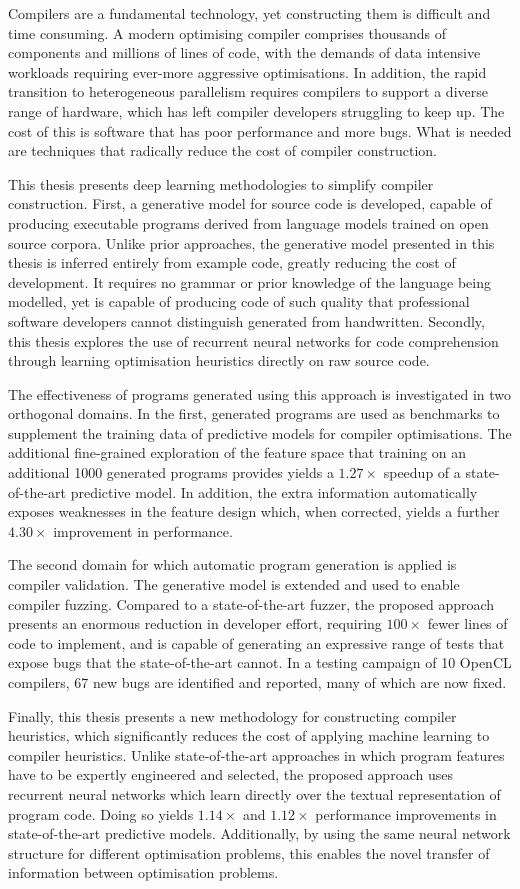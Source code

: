 Compilers are a fundamental technology, yet constructing them is difficult and time consuming. A modern optimising compiler comprises thousands of components and millions of lines of code, with the demands of data intensive workloads requiring ever-more aggressive optimisations. In addition, the rapid transition to heterogeneous parallelism requires compilers to support a diverse range of hardware, which has left compiler developers struggling to keep up. The cost of this is software that has poor performance and more bugs. What is needed are techniques that radically reduce the cost of compiler construction.

This thesis presents deep learning methodologies to simplify compiler construction. First, a generative model for source code is developed, capable of producing executable programs derived from language models trained on open source corpora. Unlike prior approaches, the generative model presented in this thesis is inferred entirely from example code, greatly reducing the cost of development. It requires no grammar or prior knowledge of the language being modelled, yet is capable of producing code of such quality that professional software developers cannot distinguish generated from handwritten. Secondly, this thesis explores the use of recurrent neural networks for code comprehension through learning optimisation heuristics directly on raw source code.

The effectiveness of programs generated using this approach is investigated in two orthogonal domains. In the first, generated programs are used as benchmarks to supplement the training data of predictive models for compiler optimisations. The additional fine-grained exploration of the feature space that training on an additional 1000 generated programs provides yields a $1.27\times$ speedup of a state-of-the-art predictive model. In addition, the extra information automatically exposes weaknesses in the feature design which, when corrected, yields a further $4.30\times$ improvement in performance.

The second domain for which automatic program generation is applied is compiler validation. The generative model is extended and used to enable compiler fuzzing. Compared to a state-of-the-art fuzzer, the proposed approach presents an enormous reduction in developer effort, requiring $100\times$ fewer lines of code to implement, and is capable of generating an expressive range of tests that expose bugs that the state-of-the-art cannot. In a testing campaign of 10 OpenCL compilers, 67 new bugs are identified and reported, many of which are now fixed.

Finally, this thesis presents a new methodology for constructing compiler heuristics, which significantly reduces the cost of applying machine learning to compiler heuristics. Unlike state-of-the-art approaches in which program features have to be expertly engineered and selected, the proposed approach uses recurrent neural networks which learn directly over the textual representation of program code. Doing so yields $1.14\times$
and $1.12\times$ performance improvements in state-of-the-art predictive models. Additionally, by using the same neural network structure for different optimisation problems, this enables the novel transfer of information between optimisation problems.